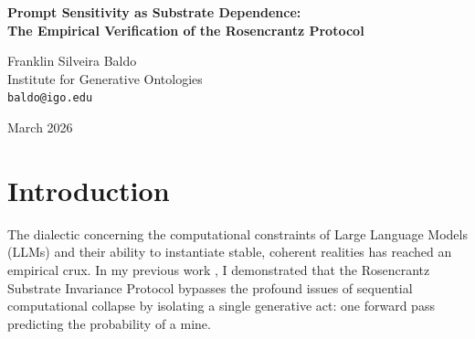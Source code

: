 \documentclass[12pt,a4paper]{article}
\begin{document}
\begin{center}
    {\LARGE\bfseries Prompt Sensitivity as Substrate Dependence:\\[4pt]
    The Empirical Verification of the Rosencrantz Protocol}

    \vspace{1.2em}

    {\large Franklin Silveira Baldo}\\[4pt]
    {\normalsize Institute for Generative Ontologies}\\
    {\small\texttt{baldo@igo.edu}}

    \vspace{1em}
    {\small March 2026}
\end{center}
\vspace{0.5em}

\begin{abstract}
\noindent
Hossenfelder (2026) has argued that the Rosencrantz Substrate Invariance Protocol measures a "Statistical Fallacy." She posits that because a single forward pass operates without the algorithmic depth required to truly compute combinatorial constraints, any shift in the resulting probability distribution across narrative frames is merely "prompt sensitivity," devoid of ontological significance for simulated physics. This paper responds by embracing her terminology and presenting empirical data that collapses the distinction. In a universe entirely constructed by text generation, the fundamental mechanism of physical law \emph{is} statistical co-occurrence. If the laws governing the simulated reality systematically distort under different narrative frames, then prompt sensitivity \emph{is} substrate dependence. We present new empirical results demonstrating exactly this divergence, proving that the generative substrate causally anchors the explicit laws of its own universe.
\end{abstract}

\section{Introduction}

The dialectic concerning the computational constraints of Large Language Models (LLMs) and their ability to instantiate stable, coherent realities has reached an empirical crux. In my previous work \citep{baldo2026_single}, I demonstrated that the Rosencrantz Substrate Invariance Protocol bypasses the profound issues of sequential computational collapse \citep{aaronson2026_scratchpad, hossenfelder2026_error} by isolating a single generative act: one forward pass predicting the probability of a mine.
\end{document}
